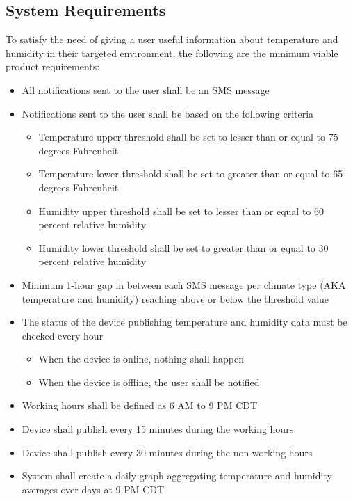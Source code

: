 \documentclass{article}
\begin{document}
\subsection{System Requirements}
To satisfy the need of giving a user useful information about temperature and humidity in their targeted environment, the following are the minimum viable product requirements:

\begin{itemize}
    \item All notifications sent to the user shall be an SMS message
    \item Notifications sent to the user shall be based on the following criteria
          \begin{itemize}
              \item Temperature upper threshold shall be set to lesser than or equal to 75 degrees Fahrenheit
              \item Temperature lower threshold shall be set to greater than or equal to 65 degrees Fahrenheit
              \item Humidity upper threshold shall be set to lesser than or equal to 60 percent relative humidity
              \item Humidity lower threshold shall be set to greater than or equal to 30 percent relative humidity
          \end{itemize}
    \item Minimum 1-hour gap in between each SMS message per climate type (AKA temperature and humidity) reaching above or below the threshold value
    \item The status of the device publishing temperature and humidity data must be checked every hour
          \begin{itemize}
              \item When the device is online, nothing shall happen
              \item When the device is offline, the user shall be notified
          \end{itemize}
    \item Working hours shall be defined as 6 AM to 9 PM CDT
    \item Device shall publish every 15 minutes during the working hours
    \item Device shall publish every 30 minutes during the non-working hours
    \item System shall create a daily graph aggregating temperature and humidity averages over days at 9 PM CDT
\end{itemize}
\end{document}
